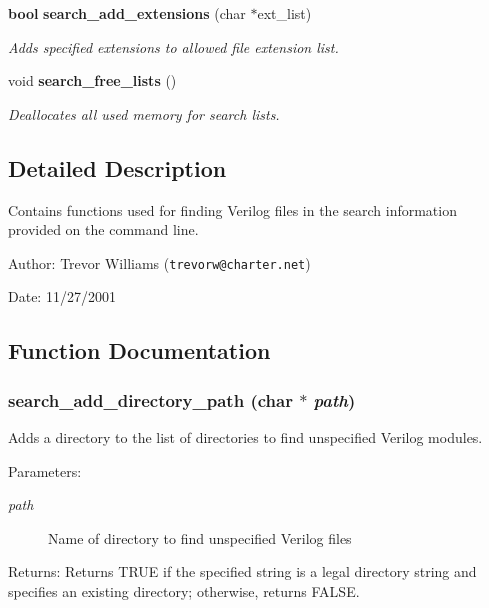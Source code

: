 \begin{CompactItemize}
{\bf bool} {\bf search\_\-add\_\-extensions} (char $\ast$ext\_\-list)
\begin{CompactList}\small\item\em Adds specified extensions to allowed file extension list.\item\end{CompactList}\item 
void {\bf search\_\-free\_\-lists} ()
\begin{CompactList}\small\item\em Deallocates all used memory for search lists.\item\end{CompactList}\end{CompactItemize}


\subsection{Detailed Description}
Contains functions used for finding Verilog files in the search information provided on the command line.

\begin{Desc}
\item[Author:]Trevor Williams ({\tt trevorw@charter.net}) \end{Desc}
\begin{Desc}
\item[Date:]11/27/2001 \end{Desc}


\subsection{Function Documentation}
\subsubsection{ search\_\-add\_\-directory\_\-path (char $\ast$ {\em path})}\label{search_8h_a2}


Adds a directory to the list of directories to find unspecified Verilog modules.

\begin{Desc}
\item[Parameters:]
\begin{description}
\item[{\em path}]Name of directory to find unspecified Verilog files \end{description}
\end{Desc}
\begin{Desc}
\item[Returns:]Returns TRUE if the specified string is a legal directory string and specifies an existing directory; otherwise, returns FALSE. \end{Desc}
